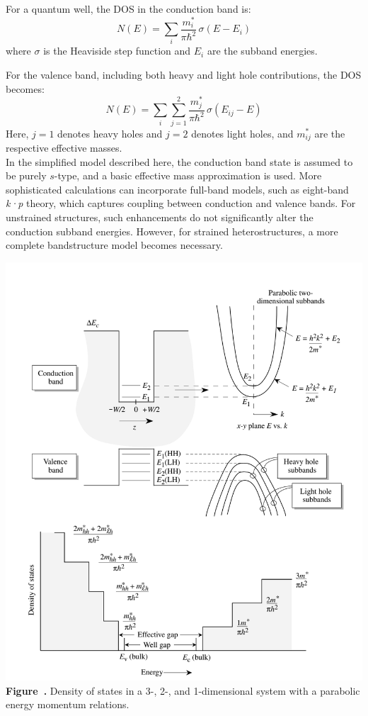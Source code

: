 For a quantum well, the DOS in the conduction band is:
\begin{equation}
	N(E) = \sum_i \frac{m_i^*}{\pi \hbar^2} \, \sigma(E - E_i)
\end{equation}
where \( \sigma \) is the Heaviside step function and \( E_i \) are the subband energies.

For the valence band, including both heavy and light hole contributions, the DOS becomes:
\begin{equation}
    N(E) = \sum_i \sum_{j=1}^{2} \frac{m_j^*}{\pi \hbar^2} \, \sigma(E_{ij} - E)
\end{equation}
Here, \( j = 1 \) denotes heavy holes and \( j = 2 \) denotes light holes, and \( m_{ij}^* \) are the respective effective masses.\\
In the simplified model described here, the conduction band state is assumed to be purely $s$-type, and a basic effective mass approximation is used. More sophisticated calculations can incorporate full-band models, such as eight-band \textit{k·p} theory, which captures coupling between conduction and valence bands. For unstrained structures, such enhancements do not significantly alter the conduction subband energies. However, for strained heterostructures, a more complete bandstructure model becomes necessary.

\begin{center}
	\begin{minipage}{0.8\textwidth}
		\centering
		\includegraphics[width=\textwidth]{img/DensityOfState.png}
		\\[0.5em]
		\textbf{Figure~\thefigure.} Density of states in a 3-, 2-, and 1-dimensional system with a parabolic energy momentum relations.
		\label{fig:DensityOfState}
	\end{minipage}
\end{center}

